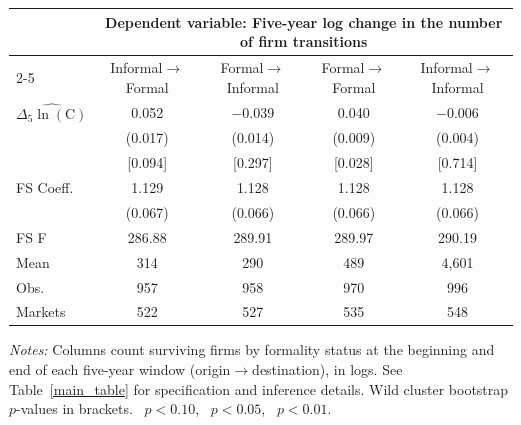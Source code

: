 \begin{threeparttable}
    \begin{tabular}{lcccc}
        \toprule
        & \multicolumn{4}{c}{\textbf{Dependent variable}: Five-year log change in the number of firm transitions} \\
        \cmidrule(lr){2-5}
        & Informal$\to$Formal & Formal$\to$Informal & Formal$\to$Formal & Informal$\to$Informal \\
        \midrule
        $\widehat{\Delta_5\ln(\text{C})}$
        & 0.052\sym{***} & $-$0.039\sym{***} & 0.040\sym{***} & $-$0.006 \\
        & (0.017) & (0.014) & (0.009) & (0.004) \\
        & [0.094] & [0.297] & [0.028] & [0.714] \\
        \midrule
        FS Coeff. & 1.129 & 1.128 & 1.128 & 1.128 \\
                  & (0.067) & (0.066) & (0.066) & (0.066) \\
        FS F & 286.88 & 289.91 & 289.97 & 290.19 \\
        Mean & 314 & 290 & 489 & 4{,}601 \\
        Obs. & 957 & 958 & 970 & 996 \\
        Markets & 522 & 527 & 535 & 548 \\
        \bottomrule
    \end{tabular}
    \begin{tablenotes}[flushleft]
        \footnotesize
        \item \textit{Notes:} Columns count surviving firms by formality status at
        the beginning and end of each five-year window (origin$\to$destination), in
        logs. See Table~\ref{main_table} for specification and inference details.
        Wild cluster bootstrap $p$-values in brackets.
        \sym{*}~$p<0.10$, \sym{**}~$p<0.05$, \sym{***}~$p<0.01$.
    \end{tablenotes}
\end{threeparttable}